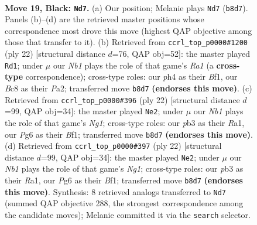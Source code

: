 \documentclass[11pt]{article}
\begin{document}
\clearpage

\begin{figure}[p]\centering
\begin{subfigure}{0.46\textwidth}\centering
\resizebox{\linewidth}{!}{%
\newchessgame
\chessboard[
  setfen={rnb1r1k1/p3b2p/2p2pp1/1p1q4/3p3P/1P1Q1PP1/P2NPK2/RNB2R2 b - - 1 19},
  showmover=false,
  pgfstyle=straightmove, color=movearrow, markmove={b8-d7}
]}
\caption{}
\end{subfigure}\hfill
\begin{subfigure}{0.46\textwidth}\centering
\resizebox{\linewidth}{!}{%
\newchessgame
\chessboard[
  setfen={r1b2rk1/pp1n1pp1/3pqn1p/2p5/2P4B/2Q1P3/PP2NPPP/R3KB1R w KQ - 2 12},
  showmover=false,
  pgfstyle=straightmove, color=movearrow, markmove={a1-d1}
]}
\caption{}
\end{subfigure}
\\[4pt]
\begin{subfigure}{0.46\textwidth}\centering
\resizebox{\linewidth}{!}{%
\newchessgame
\chessboard[
  setfen={rn1qr1k1/pbp2pp1/1p3n1p/3p4/3P3B/P1Q1PP2/1P4PP/R3KBNR w KQ - 1 12},
  showmover=false,
  pgfstyle=straightmove, color=movearrow, markmove={g1-e2}
]}
\caption{}
\end{subfigure}\hfill
\begin{subfigure}{0.46\textwidth}\centering
\resizebox{\linewidth}{!}{%
\newchessgame
\chessboard[
  setfen={rn1qr1k1/pbp2pp1/1p3n1p/3p4/3P3B/P1Q1PP2/1P4PP/R3KBNR w KQ - 1 12},
  showmover=false,
  pgfstyle=straightmove, color=movearrow, markmove={g1-e2}
]}
\caption{}
\end{subfigure}
\caption{\textbf{Move 19, Black: \texttt{Nd7}.} (a) Our position; Melanie plays \texttt{Nd7} (\texttt{b8d7}). Panels (b)--(d) are the retrieved master positions whose correspondence most drove this move (highest QAP objective among those that transfer to it). (b) Retrieved from \texttt{ccrl\_top\_p0000\#1200} (ply 22) [structural distance $d$=76, QAP obj=52]: the master played \texttt{Rd1}; under $\mu$ our \emph{Nb1} plays the role of that game's \emph{Ra1} (a \textbf{cross-type} correspondence); cross-type roles: our \emph{p}h4 as their \emph{B}f1, our \emph{B}c8 as their \emph{P}a2; transferred move \texttt{b8d7} \textbf{(endorses this move)}. (c) Retrieved from \texttt{ccrl\_top\_p0000\#396} (ply 22) [structural distance $d$=99, QAP obj=34]: the master played \texttt{Ne2}; under $\mu$ our \emph{Nb1} plays the role of that game's \emph{Ng1}; cross-type roles: our \emph{p}b3 as their \emph{R}a1, our \emph{P}g6 as their \emph{B}f1; transferred move \texttt{b8d7} \textbf{(endorses this move)}. (d) Retrieved from \texttt{ccrl\_top\_p0000\#397} (ply 22) [structural distance $d$=99, QAP obj=34]: the master played \texttt{Ne2}; under $\mu$ our \emph{Nb1} plays the role of that game's \emph{Ng1}; cross-type roles: our \emph{p}b3 as their \emph{R}a1, our \emph{P}g6 as their \emph{B}f1; transferred move \texttt{b8d7} \textbf{(endorses this move)}. Synthesis: 8 retrieved analogs transferred to \texttt{Nd7} (summed QAP objective 288, the strongest correspondence among the candidate moves); Melanie committed it via the \texttt{search} selector.}
\label{fig:thought-m37}
\end{figure}
\end{document}
